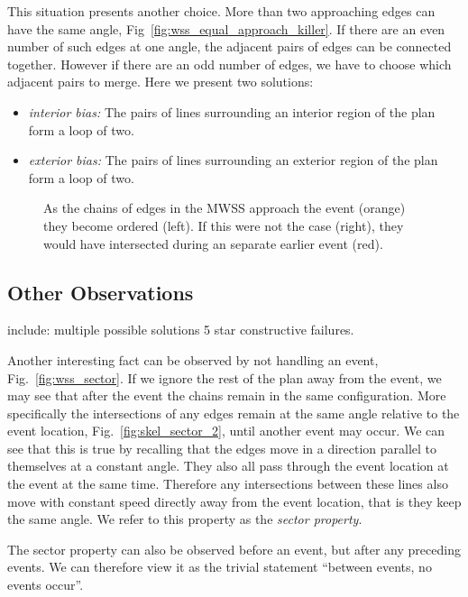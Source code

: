 This situation presents another choice. More than two approaching edges can have the same angle, Fig~\ref{fig:wss_equal_approach_killer}. If there are an even number of such edges at one angle, the adjacent pairs of edges can be connected together. However if there are an odd number of edges, we have to choose which adjacent pairs to merge. Here we present two solutions:
\begin{itemize}
\item{\emph{interior bias:} The pairs of lines surrounding an interior region of the plan form a loop of two.}
\item{\emph{exterior bias:} The pairs of lines surrounding an exterior region of the plan form a loop of two.}
\end{itemize}

\begin{figure}
  \centering
  \def\svgwidth{1.0\columnwidth}
  
  \caption[Ordering chains around the event]{\label{fig:wss_ordered_point} As the chains of edges in the MWSS approach the event (orange) they become ordered (left). If this were not the case (right), they would have intersected during an separate earlier event (red).}
\end{figure}


\subsection{Other Observations}

include: multiple possible solutions
5 star constructive failures.

Another interesting fact can be observed by not handling an event, Fig.~\ref{fig:wss_sector}. If we ignore the rest of the plan away from the event, we may see that after the event the chains remain in the same configuration. More specifically the intersections of any edges remain at the same angle relative to the event location, Fig.~\ref{fig:skel_sector_2}, until another event may occur. We can see that this is true by recalling that the edges move in a direction parallel to themselves at a constant angle. They also all pass through the event location at the event at the same time. Therefore any intersections between these lines also move with constant speed directly away from the event location, that is they keep the same angle. We refer to this property as the \emph{sector property}.

The sector property can also be observed before an event, but after any preceding events. We can therefore view it as the trivial statement ``between events, no events occur''.

